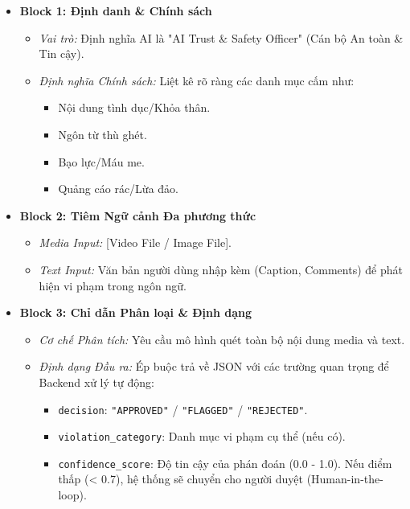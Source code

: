 \begin{itemize}
    \item \textbf{Block 1: Định danh \& Chính sách}
    \begin{itemize}
        \item \textit{Vai trò:} Định nghĩa AI là "AI Trust \& Safety Officer" (Cán bộ An toàn \& Tin cậy).
        \item \textit{Định nghĩa Chính sách:} Liệt kê rõ ràng các danh mục cấm như:
        \begin{itemize}
            \item Nội dung tình dục/Khỏa thân.
            \item Ngôn từ thù ghét.
            \item Bạo lực/Máu me.
            \item Quảng cáo rác/Lừa đảo.
        \end{itemize}
    \end{itemize}
    
    \item \textbf{Block 2: Tiêm Ngữ cảnh Đa phương thức}
    \begin{itemize}
        \item \textit{Media Input:} [Video File / Image File].
        \item \textit{Text Input:} Văn bản người dùng nhập kèm (Caption, Comments) để phát hiện vi phạm trong ngôn ngữ.
    \end{itemize}
    
    \item \textbf{Block 3: Chỉ dẫn Phân loại \& Định dạng}
    \begin{itemize}
        \item \textit{Cơ chế Phân tích:} Yêu cầu mô hình quét toàn bộ nội dung media và text.
        \item \textit{Định dạng Đầu ra:} Ép buộc trả về JSON với các trường quan trọng để Backend xử lý tự động:
        \begin{itemize}
            \item \texttt{decision}: \texttt{"APPROVED"} / \texttt{"FLAGGED"} / \texttt{"REJECTED"}.
            \item \texttt{violation\_category}: Danh mục vi phạm cụ thể (nếu có).
            \item \texttt{confidence\_score}: Độ tin cậy của phán đoán (0.0 - 1.0). Nếu điểm thấp (< 0.7), hệ thống sẽ chuyển cho người duyệt (Human-in-the-loop).
        \end{itemize}
    \end{itemize}
\end{itemize}

